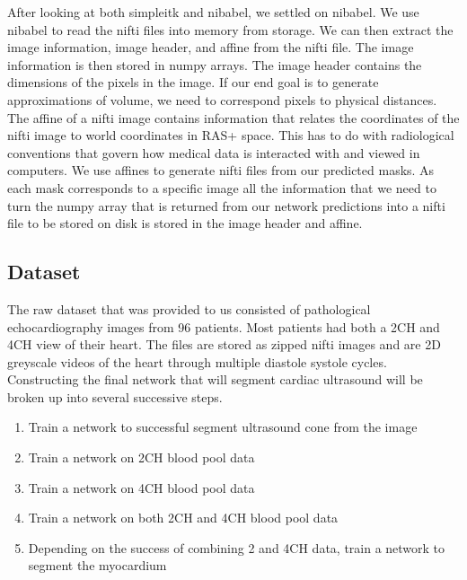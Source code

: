 \documentclass[12pt]{article}
\begin{document}
After looking at both simpleitk and nibabel, we settled on nibabel.
We use nibabel to read the nifti files into memory from storage.
We can then extract the image information, image header, and affine from the nifti file.
The image information is then stored in numpy arrays.
The image header contains the dimensions of the pixels in the image.
If our end goal is to generate approximations of volume, we need to correspond pixels to physical distances.
The affine of a nifti image contains information that relates the coordinates of the nifti image to world coordinates in RAS+ space. 
This has to do with radiological conventions that govern how medical data is interacted with and viewed in computers.
We use affines to generate nifti files from our predicted masks.
As each mask corresponds to a specific image all the information that we need to turn the numpy array that is returned from our network predictions into a nifti file to be stored on disk is stored in the image header and affine.

\subsection{Dataset}
\par
The raw dataset that was provided to us consisted of pathological echocardiography images from 96 patients. 
Most patients had both a 2CH and 4CH view of their heart. The files are stored as zipped nifti images and are 2D greyscale videos of the heart through multiple diastole systole cycles.
Constructing the final network that will segment cardiac ultrasound will be broken up into several successive steps.

\begin{enumerate}
\item Train a network to successful segment ultrasound cone from the image
\item Train a network on 2CH blood pool data
\item Train a network on 4CH blood pool data
\item Train a network on both 2CH and 4CH blood pool data
\item Depending on the success of combining 2 and 4CH data, train a network to segment the myocardium
\end{enumerate}
\end{document}
